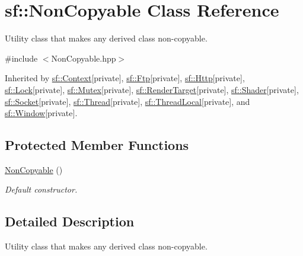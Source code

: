 \hypertarget{classsf_1_1_non_copyable}{\section{sf\+:\+:Non\+Copyable Class Reference}
\label{classsf_1_1_non_copyable}
}


Utility class that makes any derived class non-\/copyable.  




{\ttfamily \#include $<$Non\+Copyable.\+hpp$>$}



Inherited by \hyperlink{classsf_1_1_context}{sf\+::\+Context}{\ttfamily  \mbox{[}private\mbox{]}}, \hyperlink{classsf_1_1_ftp}{sf\+::\+Ftp}{\ttfamily  \mbox{[}private\mbox{]}}, \hyperlink{classsf_1_1_http}{sf\+::\+Http}{\ttfamily  \mbox{[}private\mbox{]}}, \hyperlink{classsf_1_1_lock}{sf\+::\+Lock}{\ttfamily  \mbox{[}private\mbox{]}}, \hyperlink{classsf_1_1_mutex}{sf\+::\+Mutex}{\ttfamily  \mbox{[}private\mbox{]}}, \hyperlink{classsf_1_1_render_target}{sf\+::\+Render\+Target}{\ttfamily  \mbox{[}private\mbox{]}}, \hyperlink{classsf_1_1_shader}{sf\+::\+Shader}{\ttfamily  \mbox{[}private\mbox{]}}, \hyperlink{classsf_1_1_socket}{sf\+::\+Socket}{\ttfamily  \mbox{[}private\mbox{]}}, \hyperlink{classsf_1_1_thread}{sf\+::\+Thread}{\ttfamily  \mbox{[}private\mbox{]}}, \hyperlink{classsf_1_1_thread_local}{sf\+::\+Thread\+Local}{\ttfamily  \mbox{[}private\mbox{]}}, and \hyperlink{classsf_1_1_window}{sf\+::\+Window}{\ttfamily  \mbox{[}private\mbox{]}}.

\subsection*{Protected Member Functions}
\begin{DoxyCompactItemize}
\item 
\hyperlink{classsf_1_1_non_copyable_a2110add170580fdb946f887719da6860}{Non\+Copyable} ()
\begin{DoxyCompactList}\small\item\em Default constructor. \end{DoxyCompactList}\end{DoxyCompactItemize}


\subsection{Detailed Description}
Utility class that makes any derived class non-\/copyable. 

